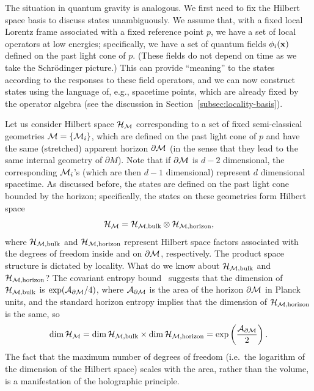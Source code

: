 \documentclass[12pt]{article}
\begin{document}
The situation in quantum gravity is analogous.  We first need to fix 
the Hilbert space basis to discuss states unambiguously.  We assume 
that, with a fixed local Lorentz frame associated with a fixed reference 
point $p$, we have a set of local operators at low energies; specifically, 
we have a set of quantum fields $\phi_i({\bf x})$ defined on the past 
light cone of $p$.  (These fields do not depend on time as we take 
the Schr\"{o}dinger picture.)  This can provide ``meaning'' to the 
states according to the responses to these field operators, and we 
can now construct states using the language of, e.g., spacetime points, 
which are already fixed by the operator algebra (see the discussion in 
Section~\ref{subsec:locality-basis}).

Let us consider Hilbert space ${\cal H}_{\cal M}$ corresponding to 
a set of fixed semi-classical geometries ${\cal M} = \{ {\cal M}_i \}$, 
which are defined on the past light cone of $p$ and have the same 
(stretched) apparent horizon $\partial {\cal M}$ (in the sense that 
they lead to the same internal geometry of $\partial M$).  Note 
that if $\partial {\cal M}$ is $d-2$ dimensional, the corresponding 
${\cal M}_i$'s (which are then $d-1$ dimensional) represent $d$ 
dimensional spacetime.  As discussed before, the states are defined 
on the past light cone bounded by the horizon; specifically, the states 
on these geometries form Hilbert space
%
\begin{equation}
  {\cal H}_{\cal M} = {\cal H}_{{\cal M}, {\rm bulk}} 
    \otimes {\cal H}_{{\cal M}, {\rm horizon}},
\label{eq:ST-H_M}
\end{equation}
%
where ${\cal H}_{{\cal M}, {\rm bulk}}$ and ${\cal H}_{{\cal M}, 
{\rm horizon}}$ represent Hilbert space factors associated with the 
degrees of freedom inside and on $\partial {\cal M}$, respectively. 
The product space structure is dictated by locality.  What do we 
know about ${\cal H}_{{\cal M}, {\rm bulk}}$ and ${\cal H}_{{\cal M}, 
{\rm horizon}}$?  The covariant entropy bound~\cite{Bousso:1999xy} 
suggests that the dimension of ${\cal H}_{{\cal M}, {\rm bulk}}$ is 
$\exp({\cal A}_{\partial {\cal M}}/4)$, where ${\cal A}_{\partial 
{\cal M}}$ is the area of the horizon $\partial {\cal M}$  in Planck 
units, and the standard horizon entropy implies that the dimension 
of ${\cal H}_{{\cal M}, {\rm horizon}}$ is the same, so
%
\begin{equation}
  {\rm dim}\,{\cal H}_{\cal M} 
  = {\rm dim}\,{\cal H}_{{\cal M}, {\rm bulk}} \times
    {\rm dim}\,{\cal H}_{{\cal M}, {\rm horizon}} 
  = \exp\left(\frac{{\cal A}_{\partial {\cal M}}}{2}\right).
\label{eq:dim-H_M}
\end{equation}
%
The fact that the maximum number of degrees of freedom (i.e.\ the logarithm 
of the dimension of the Hilbert space) scales with the area, rather 
than the volume, is a manifestation of the holographic principle.
\end{document}
